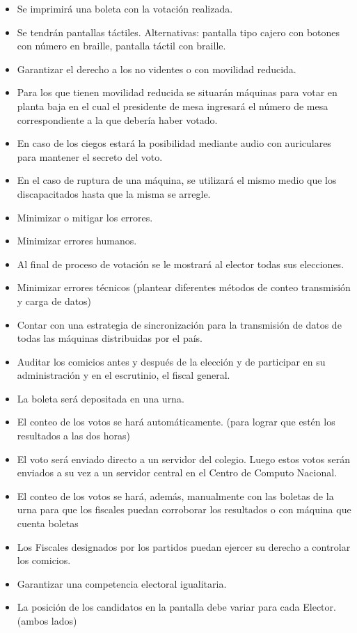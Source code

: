 \documentclass[spanish, 10pt,a4paper]{article}
\numberwithin{equation}{section} %
\begin{document}
\begin{itemize}
\item Se imprimirá una boleta con la votación realizada.
\item Se tendrán pantallas táctiles. Alternativas: pantalla tipo cajero con botones con número en braille, pantalla táctil con braille.
\item Garantizar el derecho a los no videntes o con movilidad reducida. 
\item Para los que tienen movilidad reducida se situarán máquinas para votar en planta baja en el cual el presidente de mesa ingresará el número de mesa correspondiente a la que debería haber votado.
\item En caso de los ciegos estará la posibilidad mediante audio con auriculares para mantener el secreto del voto.
\item En el caso de ruptura de una máquina, se utilizará el mismo medio que los discapacitados hasta que la misma se arregle.
\item Minimizar o mitigar los errores.
\item Minimizar errores humanos.
\item Al final de proceso de votación se le mostrará al elector todas sus elecciones.
\item Minimizar errores técnicos (plantear diferentes métodos de conteo transmisión y carga de datos)
\item Contar con una estrategia de sincronización para la transmisión de datos de todas las máquinas distribuidas por el país.
\item Auditar los comicios antes y después de la elección y de participar en su administración y en el escrutinio, el fiscal general.
\item La boleta será depositada en una urna. 
\item El conteo de los votos se hará automáticamente. (para lograr que estén los resultados a las dos horas)
\item El voto será enviado directo a un servidor del colegio. Luego estos votos serán enviados a su vez a un servidor central en el Centro de Computo Nacional. 
\item El conteo de los votos se hará, además, manualmente con las boletas de la urna para que los fiscales puedan corroborar los resultados o con máquina que cuenta boletas
\item Los Fiscales designados por los partidos puedan ejercer su derecho a controlar los comicios.
\item Garantizar una competencia electoral igualitaria.
\item La posición de los candidatos en la pantalla debe variar para cada Elector. (ambos lados)

\end{itemize}
\end{document}
